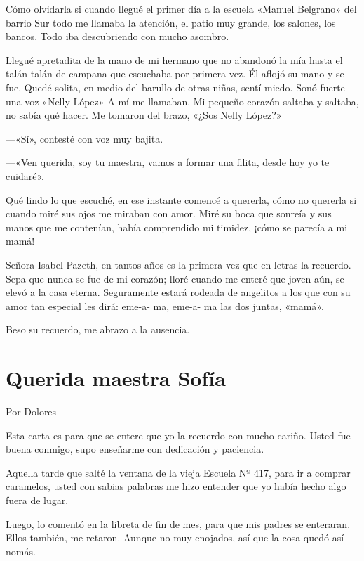 \documentclass[11pt,twoside,openright,a5paper]{book}
\begin{document}
Cómo olvidarla si cuando llegué  el primer día a la escuela «Manuel Belgrano» del barrio Sur todo me llamaba la atención, el patio muy grande, los salones, los bancos. Todo iba descubriendo con mucho asombro.

Llegué apretadita de la mano de mi hermano que no abandonó la mía hasta el talán-talán de campana que escuchaba por primera vez. Él  aflojó su mano y se fue. Quedé solita, en medio del barullo de otras niñas, sentí miedo. Sonó fuerte una voz «Nelly López» A mí me llamaban.  Mi pequeño corazón saltaba y saltaba, no sabía qué hacer. Me tomaron del brazo, «¿Sos Nelly López?»

---«Sí», contesté con voz muy bajita.

---«Ven querida, soy tu maestra, vamos a formar una filita, desde hoy yo te cuidaré». 

Qué lindo lo que escuché, en ese instante comencé a quererla, cómo no quererla si cuando miré sus ojos me miraban con amor. Miré su boca que sonreía y sus manos que me contenían, había comprendido mi timidez, ¡cómo se parecía a mi mamá!

Señora Isabel Pazeth, en tantos años es la primera vez que en letras la recuerdo. Sepa que nunca se fue de mi corazón; lloré cuando me enteré que joven aún, se elevó a la casa eterna. Seguramente estará rodeada de angelitos a los que con su amor tan especial les dirá: eme-a- ma, eme-a- ma las dos juntas, «mamá».

Beso su recuerdo, me abrazo a la ausencia.

\section*{Querida maestra Sofía}

                                                                                 \begin{flushright}Por Dolores\end{flushright}

Esta carta es para que se entere que yo la recuerdo con mucho cariño. Usted fue buena conmigo, supo enseñarme con dedicación y paciencia.

Aquella tarde que salté la ventana de la vieja Escuela Nº 417, para ir a comprar caramelos, usted con sabias palabras me hizo entender que yo había hecho algo fuera de lugar.

Luego,  lo comentó en la libreta de fin de mes, para que mis padres se enteraran. Ellos también, me retaron. Aunque no muy enojados, así que la cosa quedó así nomás.
\end{document}
